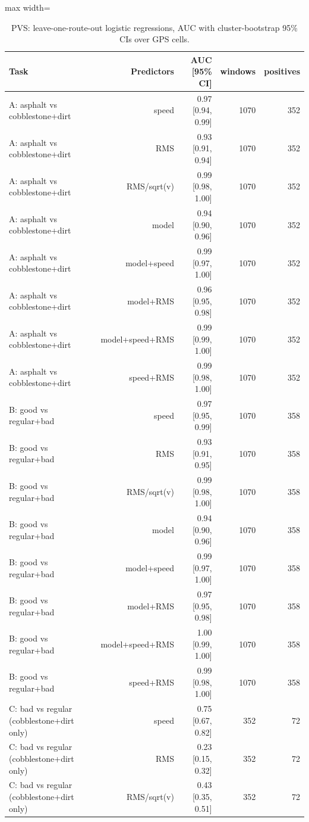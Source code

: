 \begin{table}[!htbp]
\centering
\footnotesize
\caption{PVS: leave-one-route-out logistic regressions, AUC with cluster-bootstrap 95\% CIs over GPS cells.}
\label{tab:s_pvs}
\begin{adjustbox}{max width=\columnwidth}
\begin{tabular}{lrrrr}
\toprule
\textbf{Task} & \textbf{Predictors} & \textbf{AUC [95\% CI]} & \textbf{windows} & \textbf{positives} \\
\midrule
A: asphalt vs cobblestone+dirt & speed & 0.97 [0.94, 0.99] & 1070 & 352 \\
A: asphalt vs cobblestone+dirt & RMS & 0.93 [0.91, 0.94] & 1070 & 352 \\
A: asphalt vs cobblestone+dirt & RMS/sqrt(v) & 0.99 [0.98, 1.00] & 1070 & 352 \\
A: asphalt vs cobblestone+dirt & model & 0.94 [0.90, 0.96] & 1070 & 352 \\
A: asphalt vs cobblestone+dirt & model+speed & 0.99 [0.97, 1.00] & 1070 & 352 \\
A: asphalt vs cobblestone+dirt & model+RMS & 0.96 [0.95, 0.98] & 1070 & 352 \\
A: asphalt vs cobblestone+dirt & model+speed+RMS & 0.99 [0.99, 1.00] & 1070 & 352 \\
A: asphalt vs cobblestone+dirt & speed+RMS & 0.99 [0.98, 1.00] & 1070 & 352 \\
B: good vs regular+bad & speed & 0.97 [0.95, 0.99] & 1070 & 358 \\
B: good vs regular+bad & RMS & 0.93 [0.91, 0.95] & 1070 & 358 \\
B: good vs regular+bad & RMS/sqrt(v) & 0.99 [0.98, 1.00] & 1070 & 358 \\
B: good vs regular+bad & model & 0.94 [0.90, 0.96] & 1070 & 358 \\
B: good vs regular+bad & model+speed & 0.99 [0.97, 1.00] & 1070 & 358 \\
B: good vs regular+bad & model+RMS & 0.97 [0.95, 0.98] & 1070 & 358 \\
B: good vs regular+bad & model+speed+RMS & 1.00 [0.99, 1.00] & 1070 & 358 \\
B: good vs regular+bad & speed+RMS & 0.99 [0.98, 1.00] & 1070 & 358 \\
C: bad vs regular (cobblestone+dirt only) & speed & 0.75 [0.67, 0.82] & 352 & 72 \\
C: bad vs regular (cobblestone+dirt only) & RMS & 0.23 [0.15, 0.32] & 352 & 72 \\
C: bad vs regular (cobblestone+dirt only) & RMS/sqrt(v) & 0.43 [0.35, 0.51] & 352 & 72 \\

\end{tabular}
\end{adjustbox}
\end{table}
